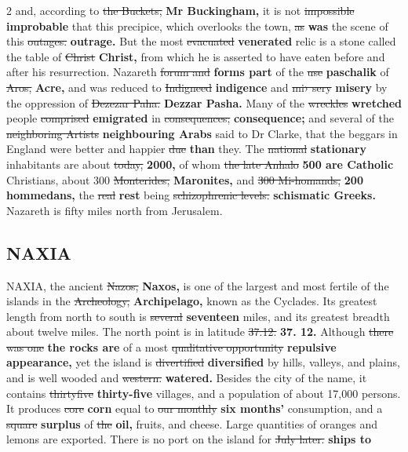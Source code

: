 \documentclass[10pt]{article}
\begin{document}
\begin{multicols}{2}
and, according to \sout{the Buckets,} \textbf{Mr Buckingham,} it is not \sout{impossible} \textbf{improbable} that this precipice, which overlooks the town, \sout{as} \textbf{was} the scene of this \sout{outages.} \textbf{outrage.} But the most \sout{evacuated} \textbf{venerated} relic is a stone called the table of \sout{Christ} \textbf{Christ,} from which he is asserted to have eaten before and after his resurrection. Nazareth \sout{forum and} \textbf{forms part} of the \sout{use} \textbf{paschalik} of \sout{Aros,} \textbf{Acre,} and was reduced to \sout{Indigneed} \textbf{indigence} and \sout{mi› sery} \textbf{misery} by the oppression of \sout{Dezezar Paha.} \textbf{Dezzar Pasha.} Many of the \sout{wreckles} \textbf{wretched} people \sout{comprised} \textbf{emigrated} in \sout{consequences;} \textbf{consequence;} and several of the \sout{neighboring Artists} \textbf{neighbouring Arabs} said to Dr Clarke, that the beggars in England were better and happier \sout{due} \textbf{than} they. The \sout{national} \textbf{stationary} inhabitants are about \sout{today,} \textbf{2000,} of whom \sout{the late Anhalo} \textbf{500 are Catholic} Christians, about 300 \sout{Monterides,} \textbf{Maronites,} and \sout{300 Mi-homands,} \textbf{200 hommedans,} the \sout{real} \textbf{rest} being \sout{schizophrenic levels.} \textbf{schismatic Greeks.} Nazareth is fifty miles north from Jerusalem.

\subsection*{NAXIA}
NAXIA, the ancient \sout{Nazos,} \textbf{Naxos,} is one of the largest and most fertile of the islands in the \sout{Archeology,} \textbf{Archipelago,} known as the Cyclades. Its greatest length from north to south is \sout{several} \textbf{seventeen} miles, and its greatest breadth about twelve miles. The north point is in latitude \sout{37.12.} \textbf{37. 12.} Although \sout{there was one} \textbf{the rocks are} of a most \sout{qualitative opportunity} \textbf{repulsive appearance,} yet the island is \sout{divertified} \textbf{diversified} by hills, valleys, and plains, and is well wooded and \sout{western.} \textbf{watered.} Besides the city of the name, it contains \sout{thirtyfive} \textbf{thirty-five} villages, and a population of about 17,000 persons. It produces \sout{core} \textbf{corn} equal to \sout{our monthly} \textbf{six months'} consumption, and a \sout{square} \textbf{surplus} of \sout{the} \textbf{oil,} fruits, and cheese. Large quantities of oranges and lemons are exported. There is no port on the island for \sout{July later.} \textbf{ships to}


\end{multicols}
\end{document}
